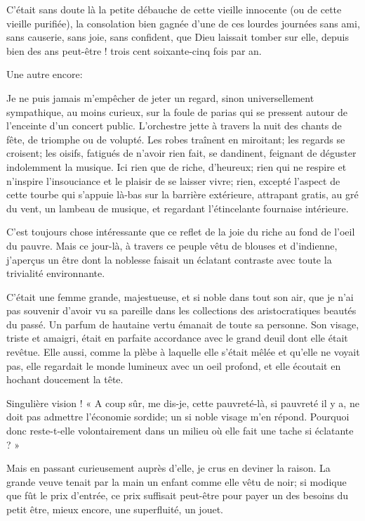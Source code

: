 C’était sans doute là la petite débauche de cette
vieille innocente (ou de cette vieille purifiée), la consolation bien
gagnée d’une de ces lourdes journées sans ami, sans
causerie, sans joie, sans confident, que Dieu laissait tomber sur elle,
depuis bien des ans peut{}-être ! trois cent soixante{}-cinq fois par
an.

Une autre encore:

Je ne puis jamais m’empêcher de jeter un regard, sinon
universellement sympathique, au moins curieux, sur la foule de parias
qui se pressent autour de l’enceinte
d’un concert public. L’orchestre
jette à travers la nuit des chants de fête, de triomphe ou de volupté.
Les robes traînent en miroitant; les regards se croisent; les oisifs,
fatigués de n’avoir rien fait, se dandinent, feignant
de déguster indolemment la musique. Ici rien que de riche,
d’heureux; rien qui ne respire et
n’inspire l’insouciance et le plaisir
de se laisser vivre; rien, excepté l’aspect de cette
tourbe qui s’appuie là{}-bas sur la barrière
extérieure, attrapant gratis, au gré du vent, un lambeau de musique, et
regardant l’étincelante fournaise intérieure.

C’est toujours chose intéressante que ce reflet de la
joie du riche au fond de l’oeil du pauvre. Mais ce
jour{}-là, à travers ce peuple vêtu de blouses et
d’indienne, j’aperçus un être dont la
noblesse faisait un éclatant contraste avec toute la trivialité
environnante.

C’était une femme grande, majestueuse, et si noble dans
tout son air, que je n’ai pas souvenir
d’avoir vu sa pareille dans les collections des
aristocratiques beautés du passé. Un parfum de hautaine vertu émanait
de toute sa personne. Son visage, triste et amaigri, était en parfaite
accordance avec le grand deuil dont elle était revêtue. Elle aussi,
comme la plèbe à laquelle elle s’était mêlée et
qu’elle ne voyait pas, elle regardait le monde
lumineux avec un oeil profond, et elle écoutait en hochant doucement la
tête.

Singulière vision ! « A coup sûr, me dis{}-je, cette pauvreté{}-là, si
pauvreté il y a, ne doit pas admettre l’économie
sordide; un si noble visage m’en répond. Pourquoi donc
reste{}-t{}-elle volontairement dans un milieu où elle fait une tache
si éclatante ? »

Mais en passant curieusement auprès d’elle, je crus en
deviner la raison. La grande veuve tenait par la main un enfant comme
elle vêtu de noir; si modique que fût le prix
d’entrée, ce prix suffisait peut{}-être pour payer un
des besoins du petit être, mieux encore, une superfluité, un jouet.

